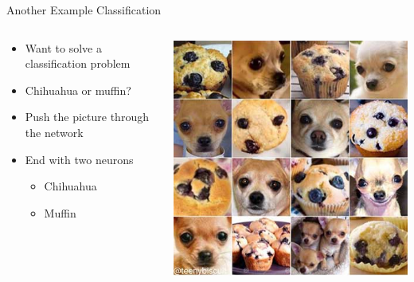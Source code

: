 \documentclass[aspectratio=169]{beamer}
\begin{document}
\begin{frame}{Another Example Classification}

\begin{columns}
\begin{column}{0.6\textwidth}
\begin{itemize}
	\item Want to solve a classification problem
	\item Chihuahua or muffin?
	\item Push the picture through the network
	\item End with two neurons
	\begin{itemize}
		\item Chihuahua
		\item Muffin
	\end{itemize}
	
\end{itemize}
\end{column}
\begin{column}{0.4\textwidth}
\includegraphics[width=1\textwidth]{lectFF/dogOrMuffin.jpeg}
\end{column}
\end{columns}
	\end{frame}
\end{document}
